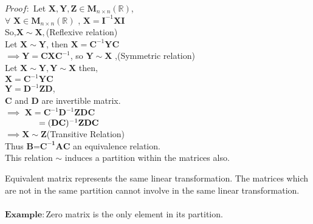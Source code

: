 \documentclass[12pt]{article}
\theoremstyle{definition}
\begin{document}
	  $\mathit{ Proof}:$ Let $\mathbf{X},\mathbf{Y},\mathbf{Z}\in \mathbf{M}_{n\times n}(\mathbb{R})$,\\
	  $\forall$ $\mathbf{X}\in \mathbf{M}_{n\times n}(\mathbb{R})$ , $\mathbf{X}={\mathbf{I}}^{-1}\mathbf{X}\mathbf{I}$ \\
	  So,$\mathbf{X} \sim \mathbf{X}, $(Reflexive relation)\\
	  Let $\mathbf{X} \sim \mathbf{Y}$, then $\mathbf{X}={\mathbf{C}}^{-1}\mathbf{Y}\mathbf{C}$\\
	  $\implies \mathbf{Y}=\mathbf{C}\mathbf{X}{\mathbf{C}}^{-1}$, so $\mathbf{Y} \sim \mathbf{X}$ ,(Symmetric relation)\\
	  Let $\mathbf{X} \sim \mathbf{Y}, \mathbf{Y} \sim \mathbf{X}$ then,\\
	  $\mathbf{X}={\mathbf{C}}^{-1}\mathbf{Y}\mathbf{C}$\\
	  $\mathbf{Y}={\mathbf{D}}^{-1}\mathbf{Z}\mathbf{D}$,\\ $\mathbf{C}$ and $\mathbf{D}$ are invertible matrix. \\
	  $\implies $ $\mathbf{X}={\mathbf{C}}^{-1}{\mathbf{D}}^{-1}\mathbf{Z}\mathbf{D}\mathbf{C}$\\
	  $\hspace*{1.4cm}=({\mathbf{D}\mathbf{C}})^{-1}\mathbf{Z}\mathbf{D}\mathbf{C}$\\
	  $\implies \mathbf{X}\sim\mathbf{Z}$(Transitive Relation)\\
	  Thus $\mathbf{B}$=$\mathbf{C^{-1}}\mathbf{A}\mathbf{C}$ an equivalence relation.\\
	  This relation $\sim$ induces a partition within the matrices also.\\
	  \begin{center}
	  \end{center}
	  Equivalent matrix represents the same linear transformation. The matrices which are not in the same partition cannot involve in the same linear transformation.\\
	  \\
	  $\mathbf{Example:}$Zero matrix is the only element in its partition.
\end{document}
